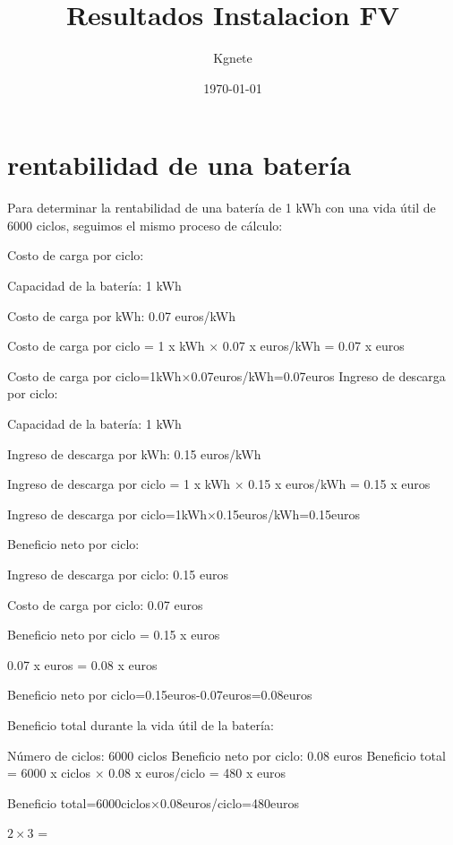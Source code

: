\documentclass{article}
\title{Resultados Instalacion FV}
\author{Kgnete}
\date{\today}
\begin{document}
\maketitle

\section*{rentabilidad de una batería}



Para determinar la rentabilidad de una batería de 1 kWh con una vida útil de 6000 ciclos, seguimos el mismo proceso de cálculo:

Costo de carga por ciclo:

Capacidad de la batería: 1 kWh

Costo de carga por kWh: 0.07 euros/kWh

Costo de carga por ciclo
=
1
x
kWh
×
0.07
x
euros/kWh
=
0.07
x
euros

Costo de carga por ciclo=1kWh×0.07euros/kWh=0.07euros
Ingreso de descarga por ciclo:


Capacidad de la batería: 1 kWh

Ingreso de descarga por kWh: 0.15 euros/kWh

Ingreso de descarga por ciclo
=
1
x
kWh
×
0.15
x
euros/kWh
=
0.15
x
euros

Ingreso de descarga por ciclo=1kWh×0.15euros/kWh=0.15euros

Beneficio neto por ciclo:

Ingreso de descarga por ciclo: 0.15 euros

Costo de carga por ciclo: 0.07 euros

Beneficio neto por ciclo
=
0.15
x
euros

0.07
x
euros
=
0.08
x
euros

Beneficio neto por ciclo=0.15euros-0.07euros=0.08euros

Beneficio total durante la vida útil de la batería:

Número de ciclos: 6000 ciclos
Beneficio neto por ciclo: 0.08 euros
Beneficio total
=
6000
x
ciclos
×
0.08
x
euros/ciclo
=
480
x
euros



Beneficio total=6000ciclos×0.08euros/ciclo=480euros

$2 \times 3$ = 


\suma
\end{document}
